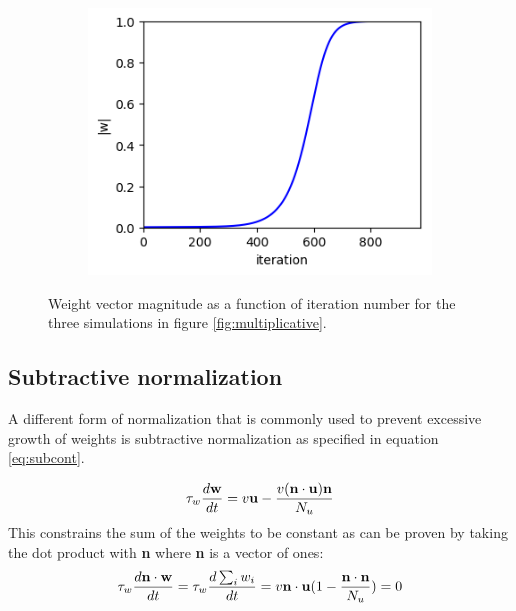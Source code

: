 \documentclass{article}
\begin{document}
\begin{figure}[h]
\begin{subfigure}[t]{0.28\linewidth}
		\subcaption{}
		\label{fig:sim2vec}	
	\end{subfigure}%
	\hspace{0.05\linewidth}
	\begin{subfigure}[t]{0.28\linewidth}
		\centering
		\includegraphics[width = 1.0\linewidth, trim={0 0 5 5}, clip=true]{figures/newmult_2d_sim3_vec.png}
		\subcaption{}
		\label{fig:sim3vec}	
	\end{subfigure}%
\caption{Weight vector magnitude as a function of iteration number for the three simulations in figure \ref{fig:multiplicative}.}
\label{fig:multiplicativevec}
\end{figure}

\subsection{Subtractive normalization}

A different form of normalization that is commonly used to prevent excessive growth of weights is subtractive normalization as specified in equation \ref{eq:subcont}.

\begin{equation}\label{eq:subcont}
\tau_w \dfrac{d\bf{w}}{dt} = v {\bf{u}} - \dfrac{v(\bf{n}\cdot {\bf{u}}) {\bf{n}}}{N_u}
\end{equation}
This constrains the sum of the weights to be constant as can be proven by taking the dot product with \textbf{n} where \textbf{n} is a vector of ones:
\begin{equation}
\tau_w \dfrac{d\bf{n} \cdot \bf{w}}{dt} = \tau_w \dfrac{d\sum_i{w_i}}{dt} = v{\bf{n}} \cdot {\bf{u}}(1 - \dfrac{\bf{n}\cdot {\bf{n}}}{N_u}) = 0
\end{equation}
\end{document}
